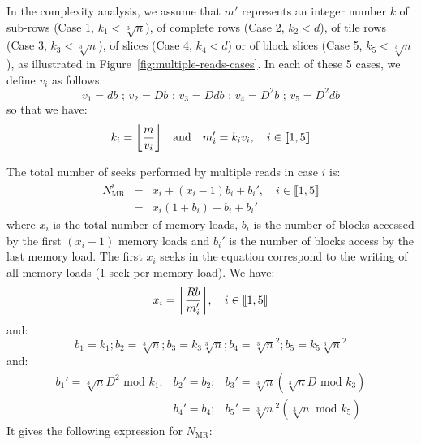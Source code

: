\documentclass[10pt, conference, compsocconf]{IEEEtran}
\DeclarePairedDelimiter{\ceil}{\lceil}{\rceil}
\DeclarePairedDelimiter{\floor}{\lfloor}{\rfloor}
\begin{document}
In the complexity analysis, we assume that $m'$ represents an integer
number $k$ of sub-rows (Case 1, $k_1<\sqrt[3]{n}$), of complete rows
(Case 2, $k_2<d$), of tile rows (Case 3, $k_3<\sqrt[3]{n}$), of slices
(Case 4, $k_4<d$) or of block slices (Case 5, $k_5<\sqrt[3]{n}$), as
illustrated in Figure~\ref{fig:multiple-reads-cases}. In each of these
5 cases, we define $v_i$ as follows:
\begin{equation*}
  v_1=db \text{ ; }  v_2=Db \text{ ; } v_3=Ddb \text{ ; } v_4=D^2b \text{ ; } v_5=D^2db
\end{equation*}
so that we have:
\begin{equation*}
k_i=\floor*{\frac{m}{v_i}} \quad \mathrm{and} \quad m_i'=k_iv_i, \quad i \in \llbracket 1,5 \rrbracket
\end{equation*}

The total number of seeks performed by multiple reads in case $i$ is:
\begin{eqnarray*}
  N^i_{\mathrm{MR}} &=& x_i + (x_i-1)b_i +b_i', \quad i \in \llbracket 1,5 \rrbracket\\
  &=& x_i \left(1+b_i\right)-b_i+b_i'
\end{eqnarray*}
where $x_i$ is the total number of memory loads, $b_i$ is the
number of blocks accessed by the first $(x_i-1)$ memory loads and
$b_i'$ is the number of blocks access by the last memory load. The
first $x_i$ seeks in the equation correspond to the writing of all memory
loads (1 seek per memory load). We have:
\begin{equation*}
  x_i = \ceil*{\frac{Rb}{m_i'}}, \quad i \in \llbracket 1,5 \rrbracket
\end{equation*}
and:
\begin{equation*}
b_1=k_1 ; b_2=\sqrt[3]{n} ; b_3 = k_3\sqrt[3]{n} ; b_4=\sqrt[3]{n}^2 ; b_5=k_5\sqrt[3]{n}^2
\end{equation*}
and:
\begin{eqnarray*}
b_1'=\sqrt[3]{n}D^2\text{ mod }k_1; &b_2'=b_2;   & b_3' = \sqrt[3]{n}\left( \sqrt[3]{n}D\text{ mod }k_3\right)\\
                                   &b_4'=b_4;  & b_5'=\sqrt[3]{n}^2\left( \sqrt[3]{n}\text{ mod }k_5\right) 
\end{eqnarray*}
It gives the following expression for $N_\mathrm{MR}$:
\end{document}
